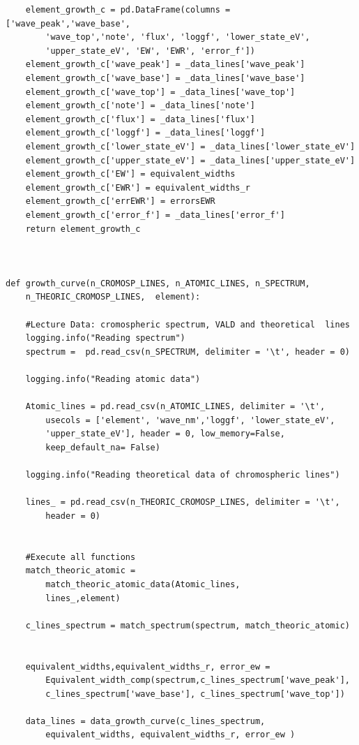 \documentclass[12pt,oneside,openany,letter]{book}
\begin{document}
\begin{verbatim}
    element_growth_c = pd.DataFrame(columns = ['wave_peak','wave_base', 
        'wave_top','note', 'flux', 'loggf', 'lower_state_eV', 
        'upper_state_eV', 'EW', 'EWR', 'error_f'])
    element_growth_c['wave_peak'] = _data_lines['wave_peak']
    element_growth_c['wave_base'] = _data_lines['wave_base']
    element_growth_c['wave_top'] = _data_lines['wave_top']
    element_growth_c['note'] = _data_lines['note']
    element_growth_c['flux'] = _data_lines['flux']
    element_growth_c['loggf'] = _data_lines['loggf']
    element_growth_c['lower_state_eV'] = _data_lines['lower_state_eV']
    element_growth_c['upper_state_eV'] = _data_lines['upper_state_eV']
    element_growth_c['EW'] = equivalent_widths
    element_growth_c['EWR'] = equivalent_widths_r
    element_growth_c['errEWR'] = errorsEWR
    element_growth_c['error_f'] = _data_lines['error_f']
    return element_growth_c



def growth_curve(n_CROMOSP_LINES, n_ATOMIC_LINES, n_SPECTRUM, 
    n_THEORIC_CROMOSP_LINES,  element):
    
    #Lecture Data: cromospheric spectrum, VALD and theoretical  lines
    logging.info("Reading spectrum")
    spectrum =  pd.read_csv(n_SPECTRUM, delimiter = '\t', header = 0)

    logging.info("Reading atomic data")
    
    Atomic_lines = pd.read_csv(n_ATOMIC_LINES, delimiter = '\t', 
        usecols = ['element', 'wave_nm','loggf', 'lower_state_eV', 
        'upper_state_eV'], header = 0, low_memory=False, 
        keep_default_na= False)
    
    logging.info("Reading theoretical data of chromospheric lines")
    
    lines_ = pd.read_csv(n_THEORIC_CROMOSP_LINES, delimiter = '\t',
        header = 0)


    #Execute all functions
    match_theoric_atomic = 
        match_theoric_atomic_data(Atomic_lines, 
        lines_,element)

    c_lines_spectrum = match_spectrum(spectrum, match_theoric_atomic)

    
    equivalent_widths,equivalent_widths_r, error_ew =
        Equivalent_width_comp(spectrum,c_lines_spectrum['wave_peak'], 
        c_lines_spectrum['wave_base'], c_lines_spectrum['wave_top'])
    
    data_lines = data_growth_curve(c_lines_spectrum,
        equivalent_widths, equivalent_widths_r, error_ew )


\end{verbatim}
\end{document}
